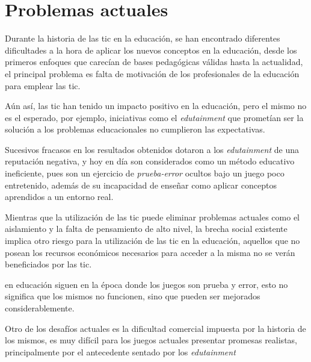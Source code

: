 \section{Problemas actuales}

Durante la historia de las \Gls{tic} en la educación, se han encontrado
diferentes dificultades a la hora de aplicar los nuevos conceptos en la
educación, desde los primeros enfoques que carecían de bases pedagógicas válidas
hasta la actualidad, el principal problema es falta de motivación de los
profesionales de la educación para emplear las
\Gls{tic}\cite{punie:ict,ict:romeo}.


Aún así, las \Gls{tic} han tenido un impacto positivo en la educación, pero el
mismo no es el esperado\cite{punie:ict}, por ejemplo, iniciativas como el
\emph{edutainment} que prometían ser la solución a los problemas
educacionales no cumplieron las expectativas. 

Sucesivos fracasos en los resultados obtenidos dotaron a los \emph{edutainment}
de una reputación negativa, y hoy en día son considerados como un método educativo 
ineficiente, pues son un ejercicio de \emph{prueba-error}
ocultos bajo un juego poco entretenido\cite{resnick:2004}, además de su
incapacidad de enseñar como aplicar conceptos aprendidos a un entorno
real\cite{resnick:2004}.


Mientras que la utilización de las \Gls{tic} puede eliminar problemas actuales
como el aislamiento y la falta de pensamiento de alto nivel\cite{punie:ict}, la
brecha social existente implica otro riesgo para la utilización de las \Gls{tic}
en la educación, aquellos que no posean los recursos económicos necesarios para
acceder a la misma no se verán beneficiados por las \Gls{tic}\cite{punie:ict}.

 en
educación siguen en la época donde los juegos son prueba y error, esto no
significa que los mismos no funcionen, sino que pueden ser mejorados
considerablemente\cite{egenfeldt2007third}.

Otro de los desafíos actuales es la dificultad comercial impuesta por la
historia de los mismos, es muy difícil para los juegos actuales presentar
promesas realistas, principalmente por el antecedente sentado por los
\emph{edutainment}\cite{egenfeldt2007third}
